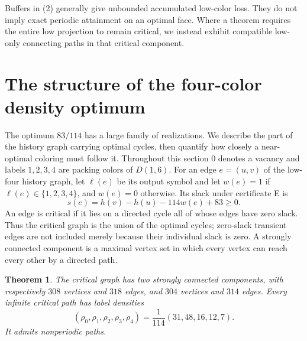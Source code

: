 \documentclass[11pt,reqno]{amsart}
\theoremstyle{plain}
\newtheorem{theorem}{Theorem}
\newcommand{\D}[1]{D(1,#1)}
\theoremstyle{plain}
\theoremstyle{plain}
\begin{document}
Buffers in (2) generally give unbounded accumulated low-color loss.
They do not imply exact periodic attainment on an optimal face.
Where a theorem requires the entire low projection to remain critical,
we instead exhibit compatible low-only connecting paths in that
critical component.

\section{The structure of the four-color density optimum}\label{M-sec:critical}

The optimum $83/114$ has a large family of realizations. We describe the
part of the history graph carrying optimal cycles, then quantify how
closely a near-optimal coloring must follow it. Throughout this section
$0$ denotes a vacancy and labels $1,2,3,4$ are packing colors of $\D{6}$.
For an edge $e=(u,v)$ of the low-four history graph, let $\ell(e)$ be its
output symbol and let $w(e)=1$ if $\ell(e)\in\{1,2,3,4\}$, and $w(e)=0$
otherwise. Its slack under certificate E is
\[
 s(e)=h(v)-h(u)-114w(e)+83\ge0.
\]
An edge is critical if it lies on a directed cycle all of whose edges have
zero slack. Thus the critical graph is the union of the optimal cycles;
zero-slack transient edges are not included merely because their individual
slack is zero. A strongly connected component is a maximal vertex set in
which every vertex can reach every other by a directed path.

\begin{theorem}\label{M-thm:critical-structure}
The critical graph has two strongly connected components, with respectively
$308$ vertices and $318$ edges, and $304$ vertices and $314$ edges.
Every infinite critical path has label densities
\[
 (\rho_0,\rho_1,\rho_2,\rho_3,\rho_4)
   =\frac1{114}(31,48,16,12,7).
\]
It admits nonperiodic paths. \end{theorem}
\end{document}
